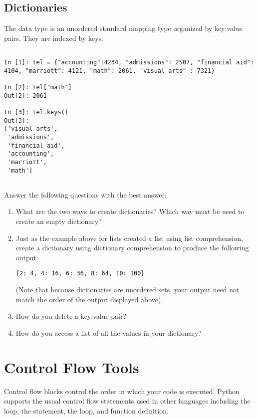 \subsection*{Dictionaries}
\begin{example}

The  data type is an unordered standard mapping type 
organized by key:value pairs. They are indexed by keys. 

\begin{lstlisting}

In [1]: tel = {"accounting":4234, "admissions": 2507, "financial aid": 4104, "marriott": 4121, "math": 2061, "visual arts" : 7321} 

In [2]: tel["math"]
Out[2]: 2061

In [3]: tel.keys()
Out[3]: 
['visual arts',
 'admissions',
 'financial aid',
 'accounting',
 'marriott',
 'math']
 
\end{lstlisting}
\end{example}

\begin{problem}
Answer the following questions with the best answer:
\begin{enumerate}
\item What are the two ways to create dictionaries? Which way must be used to
create an empty dictionary?
\item Just as the example above for lists created a list using list comprehension, 
create a dictionary using dictionary comprehension to produce the following output:

\begin{lstlisting}
{2: 4, 4: 16, 6: 36, 8: 64, 10: 100}
\end{lstlisting}

(Note that because dictionaries are unordered sets, your output need not match the 
order of the output displayed above).
\item How do you delete a key:value pair?
\item How do you access a list of all the values in your dictionary? 

\end{enumerate}
\end{problem}


\section*{Control Flow Tools}

Control flow blocks control the order in which your code is executed.
Python supports the usual control flow statements used in other languages
including the  loop, the  statement, the  loop, 
and function definition. 

